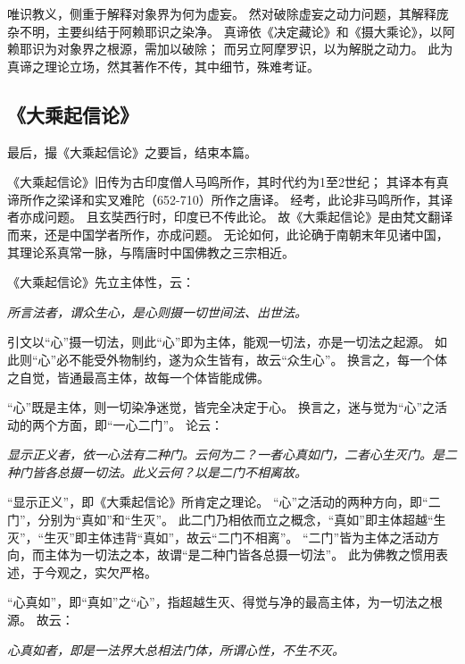 \documentclass[11pt]{article}
\begin{document}
\par

唯识教义，侧重于解释对象界为何为虚妄。
然对破除虚妄之动力问题，其解释庞杂不明，主要纠结于阿赖耶识之染净。
真谛依《决定藏论》和《摄大乘论》，以阿赖耶识为对象界之根源，需加以破除；
而另立阿摩罗识，以为解脱之动力。
此为真谛之理论立场，然其著作不传，其中细节，殊难考证。

\subsection{《大乘起信论》}
最后，撮《大乘起信论》之要旨，结束本篇。

\par

《大乘起信论》旧传为古印度僧人马鸣所作，其时代约为1至2世纪；
其译本有真谛所作之梁译和实叉难陀（652-710）所作之唐译。
经考，此论非马鸣所作，其译者亦成问题。
且玄奘西行时，印度已不传此论。
故《大乘起信论》是由梵文翻译而来，还是中国学者所作，亦成问题。
无论如何，此论确于南朝末年见诸中国，其理论系真常一脉，与隋唐时中国佛教之三宗相近。

\par

《大乘起信论》先立主体性，云：

\textit{所言法者，谓众生心，是心则摄一切世间法、出世法。}

引文以“心”摄一切法，则此“心”即为主体，能观一切法，亦是一切法之起源。
如此则“心”必不能受外物制约，遂为众生皆有，故云“众生心”。
换言之，每一个体之自觉，皆通最高主体，故每一个体皆能成佛。

\par

“心”既是主体，则一切染净迷觉，皆完全决定于心。
换言之，迷与觉为“心”之活动的两个方面，即“一心二门”。
论云：

\textit{显示正义者，依一心法有二种门。云何为二？一者心真如门，二者心生灭门。是二种门皆各总摄一切法。此义云何？以是二门不相离故。}

“显示正义”，即《大乘起信论》所肯定之理论。
“心”之活动的两种方向，即“二门”，分别为“真如”和“生灭”。
此二门乃相依而立之概念，“真如”即主体超越“生灭”，“生灭”即主体违背“真如”，故云“二门不相离”。
“二门”皆为主体之活动方向，而主体为一切法之本，故谓“是二种门皆各总摄一切法”。
此为佛教之惯用表述，于今观之，实欠严格。

\par

“心真如”，即“真如”之“心”，指超越生灭、得觉与净的最高主体，为一切法之根源。
故云：

\textit{心真如者，即是一法界大总相法门体，所谓心性，不生不灭。}
\end{document}

